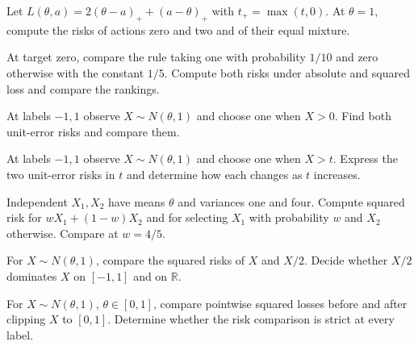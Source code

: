\documentclass[11pt,oneside]{book}
\theoremstyle{definition}
\theoremstyle{remark}
\newcommand{\R}{\mathbb R}
\begin{document}
\begin{practiceexercise}
\label{wex:asymmetric-numeric-loss}
Let $L(\theta,a)=2(\theta-a)_++(a-\theta)_+$ with $t_+=\max(t,0)$. At
$\theta=1$, compute the risks of actions zero and two and of their equal
mixture.
\end{practiceexercise}

\begin{practiceexercise}
\label{wex:loss-reverses-ranking}
At target zero, compare the rule taking one with probability $1/10$ and zero
otherwise with the constant $1/5$. Compute both risks under absolute and
squared loss and compare the rankings.
\end{practiceexercise}

\begin{practiceexercise}
\label{wex:symmetric-normal-classification-risk}
At labels $-1,1$ observe $X\sim N(\theta,1)$ and choose one when $X>0$. Find
both unit-error risks and compare them.
\end{practiceexercise}

\begin{practiceexercise}
\label{wex:shifted-threshold-tradeoff}
At labels $-1,1$ observe $X\sim N(\theta,1)$ and choose one when $X>t$.
Express the two unit-error risks in $t$ and determine how each changes as
$t$ increases.
\end{practiceexercise}

\begin{practiceexercise}
\label{wex:weighted-normal-risk}
Independent $X_1,X_2$ have means $\theta$ and variances one and four.
Compute squared risk for $wX_1+(1-w)X_2$ and for selecting $X_1$ with
probability $w$ and $X_2$ otherwise. Compare at $w=4/5$.
\end{practiceexercise}

\begin{practiceexercise}
\label{wex:bounded-normal-shrinkage}
For $X\sim N(\theta,1)$, compare the squared risks of $X$ and $X/2$. Decide
whether $X/2$ dominates $X$ on $[-1,1]$ and on $\R$.
\end{practiceexercise}

\begin{practiceexercise}
\label{wex:clip-reduces-square}
For $X\sim N(\theta,1)$, $\theta\in[0,1]$, compare pointwise squared losses
before and after clipping $X$ to $[0,1]$. Determine whether the risk
comparison is strict at every label.
\end{practiceexercise}
\end{document}
